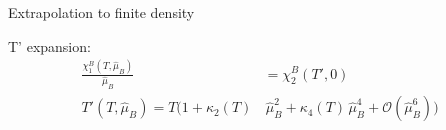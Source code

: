 \begin{frame}[fragile]{Extrapolation to finite density}
    \vspace{-0.2cm}
    \begin{block}{T' expansion:}
        \begin{align}
            \frac{\chi^B_1(T,\hat{\mu}_B)}{\hat{\mu}_B}&=\chi^B_2(T',0)\\[2ex]
            T'(T,\hat{\mu}_B)=T\Big(1+\kappa_2(T)&\,\hat{\mu}_B^2+\kappa_4(T)\,\hat{\mu}_B^4+\mathcal{O}(\hat{\mu}_B^6)\Big)
        \end{align}
    \end{block}
\end{frame}
